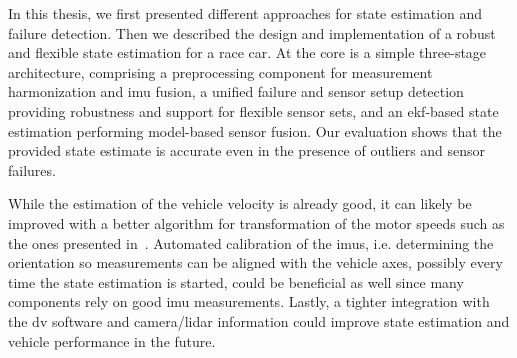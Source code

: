 In this thesis, we first presented different approaches for state estimation and failure detection. Then we described the design and implementation of a robust and flexible state estimation for a race car. At the core is a simple three-stage architecture, comprising a preprocessing component for measurement harmonization and \gls{imu} fusion, a unified failure and sensor setup detection providing robustness and support for flexible sensor sets, and an \gls{ekf}-based state estimation performing model-based sensor fusion. Our evaluation shows that the provided state estimate is accurate even in the presence of outliers and sensor failures.

While the estimation of the vehicle velocity is already good, it can likely be improved with a better algorithm for transformation of the motor speeds such as the ones presented in~\cite{Song.2002}. Automated calibration of the \glspl{imu}, i.e. determining the orientation so measurements can be aligned with the vehicle axes, possibly every time the state estimation is started, could be beneficial as well since many components rely on good \gls{imu} measurements. Lastly, a tighter integration with the \gls{dv} software and camera/lidar information could improve state estimation and vehicle performance in the future.
